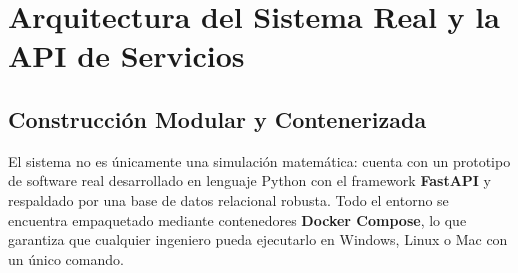 \documentclass[11pt,a4paper]{article}
\begin{document}
\section{Arquitectura del Sistema Real y la API de Servicios}

\subsection{Construcción Modular y Contenerizada}
El sistema no es únicamente una simulación matemática: cuenta con un prototipo de software real desarrollado en lenguaje Python con el framework \textbf{FastAPI} y respaldado por una base de datos relacional robusta. Todo el entorno se encuentra empaquetado mediante contenedores \textbf{Docker Compose}, lo que garantiza que cualquier ingeniero pueda ejecutarlo en Windows, Linux o Mac con un único comando.
\end{document}
